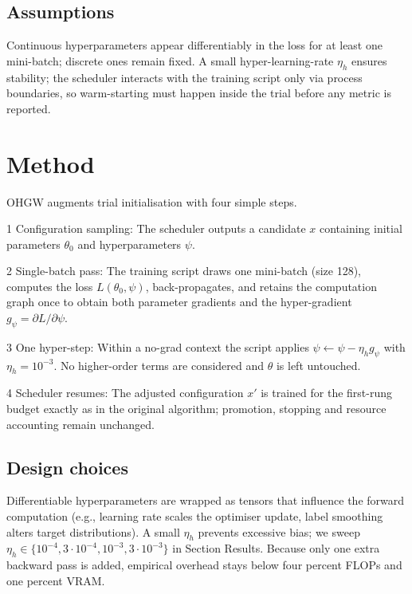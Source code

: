 \documentclass{article}
\begin{document}
\subsection{Assumptions}
Continuous hyperparameters appear differentiably in the loss for at least one mini-batch; discrete ones remain fixed. A small hyper-learning-rate \(\eta_h\) ensures stability; the scheduler interacts with the training script only via process boundaries, so warm-starting must happen inside the trial before any metric is reported.

\section{Method}
OHGW augments trial initialisation with four simple steps.

1 Configuration sampling: The scheduler outputs a candidate \(x\) containing initial parameters \(\theta_0\) and hyperparameters \(\psi\).

2 Single-batch pass: The training script draws one mini-batch (size 128), computes the loss \(L(\theta_0,\psi)\), back-propagates, and retains the computation graph once to obtain both parameter gradients and the hyper-gradient \(g_{\psi} = \partial L/\partial \psi\).

3 One hyper-step: Within a no-grad context the script applies \(\psi \leftarrow \psi - \eta_h g_{\psi}\) with \(\eta_h = 10^{-3}\). No higher-order terms are considered and \(\theta\) is left untouched.

4 Scheduler resumes: The adjusted configuration \(x'\) is trained for the first-rung budget exactly as in the original algorithm; promotion, stopping and resource accounting remain unchanged.

\subsection{Design choices}
Differentiable hyperparameters are wrapped as tensors that influence the forward computation (e.g., learning rate scales the optimiser update, label smoothing alters target distributions). A small \(\eta_h\) prevents excessive bias; we sweep \(\eta_h\in\{10^{-4}, 3\cdot 10^{-4}, 10^{-3}, 3\cdot 10^{-3}\}\) in Section Results. Because only one extra backward pass is added, empirical overhead stays below four percent FLOPs and one percent VRAM.
\end{document}
